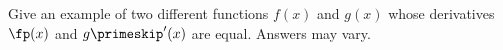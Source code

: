 {Give an example of two different functions $f(x)$ and $g(x)$ whose derivatives $\fp(x)$ and $g\primeskip'(x)$ are equal.
}
{Answers may vary.
}
